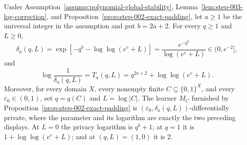 \begin{proposition}\label{prop:step-003-exact-privacy-schedule}
Under Assumption~\ref{assump:polynomial-global-stability},
Lemma~\ref{lem:step-003-log-correction}, and
Proposition~\ref{prop:step-002-exact-padding}, let \(a\geq1\) be the
universal integer in the assumption and put \(b=2a+2\).  For every
\(q\geq1\) and \(L\geq0\),
\begin{equation}
\delta_a(q,L)
=\exp[-q^b-\log\log(e^e+L)]
=\frac{e^{-q^b}}{\log(e^e+L)}
\in(0,e^{-2}],
\label{eq:app-a42}
\end{equation}
and
\begin{equation}
\log\frac1{\delta_a(q,L)}
=T_a(q,L)
=q^{2a+2}+\log\log(e^e+L).
\label{eq:app-a43}
\end{equation}
Moreover, for every domain \(X\), every nonempty finite
\(C\subseteq\{0,1\}^X\), and every \(\varepsilon_0\in(0,1)\), set
\(q=q(C)\) and \(L=\log|C|\).  The learner \(M_C\) furnished by
Proposition~\ref{prop:step-002-exact-padding} is
\((\varepsilon_0,\delta_a(q,L))\)-differentially private, where the
parameter and its logarithm are exactly the two preceding displays.
At \(L=0\) the privacy logarithm is \(q^b+1\); at
\(q=1\) it is \(1+\log\log(e^e+L)\); and at \((q,L)=(1,0)\) it is
\(2\).
\end{proposition}

